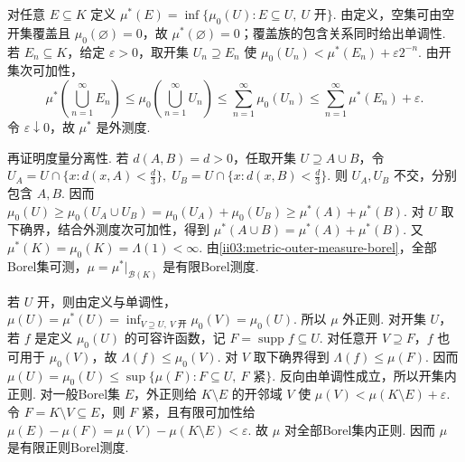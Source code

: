 \begin{FAProof}
对任意 \(\displaystyle E\subseteq K\) 定义
\(\displaystyle \mu^*(E)=\inf\{\mu_0(U):E\subseteq U,\ U\text{ 开}\}.\)
由定义，空集可由空开集覆盖且 \(\displaystyle\mu_0(\varnothing)=0\)，故 \(\displaystyle\mu^*(\varnothing)=0\)；覆盖族的包含关系同时给出单调性. 若 \(\displaystyle E_n\subseteq K\)，给定 \(\displaystyle\varepsilon>0\)，取开集 \(\displaystyle U_n\supseteq E_n\) 使
\(\displaystyle \mu_0(U_n)<\mu^*(E_n)+\varepsilon2^{-n}.\)
由开集次可加性，
\[
\mu^*\left(\bigcup_{n=1}^{\infty}E_n\right)
\leqslant\mu_0\left(\bigcup_{n=1}^{\infty}U_n\right)
\leqslant\sum_{n=1}^{\infty}\mu_0(U_n)
\leqslant\sum_{n=1}^{\infty}\mu^*(E_n)+\varepsilon.
\]
令 \(\displaystyle\varepsilon\downarrow0\)，故 \(\displaystyle\mu^*\) 是外测度.

再证明度量分离性. 若 \(\displaystyle d(A,B)=d>0\)，任取开集 \(\displaystyle U\supseteq A\cup B\)，令
\(\displaystyle U_A=U\cap\{x:d(x,A)<\frac{d}{3}\}, \; U_B=U\cap\{x:d(x,B)<\frac{d}{3}\}.\)
则 \(\displaystyle U_A,U_B\) 不交，分别包含 \(\displaystyle A,B\). 因而
\(\displaystyle \mu_0(U) \geqslant\mu_0(U_A\cup U_B) =\mu_0(U_A)+\mu_0(U_B) \geqslant\mu^*(A)+\mu^*(B).\)
对 \(\displaystyle U\) 取下确界，结合外测度次可加性，得到
\(\displaystyle \mu^*(A\cup B)=\mu^*(A)+\mu^*(B).\)
又 \(\displaystyle\mu^*(K)=\mu_0(K)=\Lambda(1)<\infty\). 由\autoref{ii03:metric-outer-measure-borel}，全部Borel集可测，\(\displaystyle\mu=\mu^*|_{\mathcal B(K)}\) 是有限Borel测度.

若 \(\displaystyle U\) 开，则由定义与单调性，
\(\displaystyle \mu(U)=\mu^*(U) =\inf_{V\supseteq U,\ V\text{ 开}}\mu_0(V) =\mu_0(U).\)
所以 \(\displaystyle\mu\) 外正则. 对开集 \(\displaystyle U\)，若 \(\displaystyle f\) 是定义 \(\displaystyle\mu_0(U)\) 的可容许函数，记 \(\displaystyle F=\operatorname{supp}f\subseteq U\). 对任意开 \(\displaystyle V\supseteq F\)，\(\displaystyle f\) 也可用于 \(\displaystyle\mu_0(V)\)，故 \(\displaystyle\Lambda(f)\leqslant\mu_0(V)\). 对 \(\displaystyle V\) 取下确界得到 \(\displaystyle\Lambda(f)\leqslant\mu(F)\). 因而
\(\displaystyle \mu(U)=\mu_0(U) \leqslant\sup\{\mu(F):F\subseteq U,\ F\text{ 紧}\}.\)
反向由单调性成立，所以开集内正则. 对一般Borel集 \(\displaystyle E\)，外正则给 \(\displaystyle K\setminus E\) 的开邻域 \(\displaystyle V\) 使 \(\displaystyle\mu(V)<\mu(K\setminus E)+\varepsilon\). 令 \(\displaystyle F=K\setminus V\subseteq E\)，则 \(\displaystyle F\) 紧，且有限可加性给
\(\displaystyle \mu(E)-\mu(F)=\mu(V)-\mu(K\setminus E)<\varepsilon.\)
故 \(\displaystyle\mu\) 对全部Borel集内正则. 因而 \(\displaystyle\mu\) 是有限正则Borel测度.


\end{FAProof}
